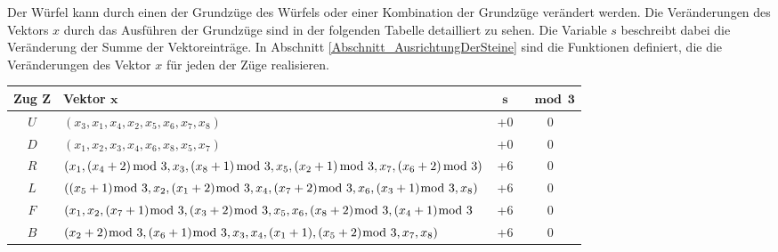 \documentclass[12pt,a4paper, usenames, dvipsnames]{article}
\theoremstyle{mystyle}
\theoremstyle{definition}
\begin{document}
Der Würfel kann durch einen der Grundzüge des Würfels oder einer Kombination der Grundzüge verändert werden. Die Veränderungen des Vektors $x$ durch das Ausführen der Grundzüge sind in der folgenden Tabelle detailliert zu sehen. Die Variable $s$ beschreibt dabei die Veränderung der Summe der Vektoreinträge. In Abschnitt \ref{Abschnitt_AusrichtungDerSteine} sind die Funktionen definiert, die die Veränderungen des Vektor $x$ für jeden der Züge realisieren. 
\ \\


\begin{adjustbox}{width=1\textwidth,center}
\begin{tabular}{c l c c }
\toprule

\textbf{Zug} $\boldsymbol{Z}$ & \textbf{Vektor} $\boldsymbol{x}$ & $\boldsymbol{s}$  & $\boldsymbol{\mod 3}$ \\

\midrule

$U$ & $(x_3, x_1,x_4,x_2,x_5,x_6,x_7,x_8)$ & +0 & 0 \\

$D$ & $(x_1,x_2,x_3,x_4,x_6,x_8,x_5,x_7)$ & +0 & 0 \\

$R$ & $(x_1,(x_4 + 2) \hspace*{-0.5em} \mod 3,x_3,(x_8 + 1) \hspace*{-0.5em} \mod 3,x_5,(x_2 +1) \hspace*{-0.5em} \mod 3,x_7,(x_6 + 2) \hspace*{-0.5em} \mod 3)$ & +6 & 0 \\

$L$ & $((x_5 + 1) \hspace*{-0.6em} \mod 3, x_2, (x_1 + 2) \hspace*{-0.6em} \mod 3, x_4, (x_7 + 2) \hspace*{-0.6em} \mod 3, x_6, (x_3 + 1) \hspace*{-0.6em} \mod 3, x_8)$ & +6 & 0 \\

$F$ & $(x_1, x_2, (x_7 +1) \hspace*{-0.6em} \mod 3, (x_3 + 2)  \hspace*{-0.6em} \mod 3, x_5, x_6, (x_8 +2)  \hspace*{-0.6em} \mod 3, (x_4 + 1) \hspace*{-0.6em} \mod 3$ & +6 & 0 \\

$B$ & $(x_2 +2) \hspace*{-0.6em} \mod 3, (x_6 + 1)  \hspace*{-0.6em} \mod 3, x_3, x_4,(x_1 + 1), (x_5 + 2)  \hspace*{-0.6em} \mod 3, x_7, x_8)$ & +6 & 0 \\

\bottomrule
\end{tabular}
\end{adjustbox}
\ \\
\end{document}
